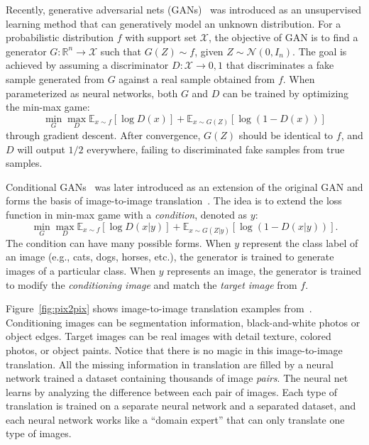 Recently, generative adversarial nets (GANs)~\cite{goodfellow2014generative} 
was 
introduced as an unsupervised learning method that can generatively model an 
unknown distribution. 
For a probabilistic distribution $f$ with support set $\mathcal{X}$, the 
objective of GAN is to find a generator $G:\mathbb{R}^n\rightarrow \mathcal{X}$ 
such that $G(Z)\sim f$, given $Z\sim \mathcal{N}(0,I_n)$. 
The goal is achieved by assuming a discriminator $D:\mathcal{X}\rightarrow 
{0,1}$ that discriminates a fake sample generated from $G$ against a real 
sample 
obtained from $f$. 
When parameterized as neural networks, both $G$ and $D$ can be trained by 
optimizing the min-max game: 
\begin{equation}
\min_G \max_D \mathbb{E}_{x\sim f}[\log D(x)] + \mathbb{E}_{x\sim G(Z)}[\log 
(1-D(x))]
\end{equation}
through gradient descent.
After convergence, $G(Z)$ should be identical to $f$, and $D$ will output $1/2$ 
everywhere, failing to discriminated fake samples from true samples. 

Conditional GANs~\cite{mirza2014conditional} was later introduced as an 
extension of the original GAN and forms the basis of image-to-image 
translation~\cite{isola2017image}. 
The idea is to extend the loss function in min-max game with a 
\textit{condition}, denoted as $y$: 
\begin{equation}
\min_G \max_D \mathbb{E}_{x\sim f}[\log D(x|y)] + \mathbb{E}_{x\sim 
G(Z|y)}[\log (1-D(x|y))]. 
\end{equation}
The condition can have many possible forms.
When $y$ represent the class label of an image (e.g., cats, dogs, horses, 
etc.), 
the generator is trained to generate images of a particular class. 
When $y$ represents an image, the generator is trained to modify the 
\textit{conditioning image} and match the \textit{target image} from $f$. 

Figure~\ref{fig:pix2pix} shows image-to-image translation examples 
from~\cite{isola2017image}. Conditioning images can be segmentation 
information, black-and-white photos or object edges. Target images can be real 
images with detail texture, colored photos, or object paints. Notice that there 
is no magic in this image-to-image translation.
All the missing information in translation are filled by a neural network 
trained a dataset containing thousands of image \textit{pairs}. 
The neural net learns by analyzing the difference between each pair of images.
Each type of translation is trained on a separate neural network and a 
separated 
dataset, and each neural network works like a ``domain expert'' that can only 
translate one type of images. 

